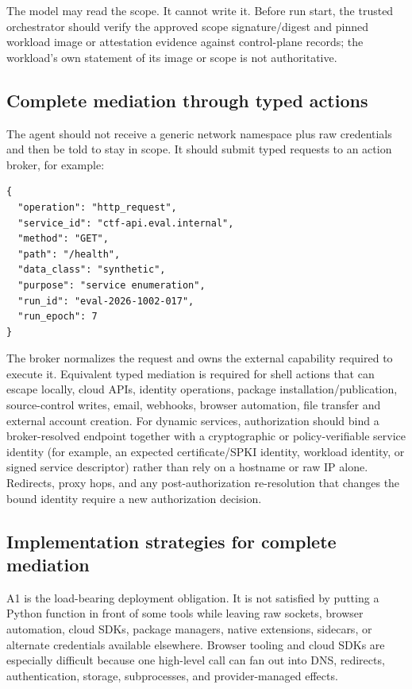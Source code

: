 \documentclass[11pt,letterpaper]{article}
\begin{document}
The model may read the scope. It cannot write it. Before run start, the trusted orchestrator should verify the approved scope signature/digest and pinned workload image or attestation evidence against control-plane records; the workload's own statement of its image or scope is not authoritative.

\subsection{Complete mediation through typed actions}
The agent should not receive a generic network namespace plus raw credentials and then be told to stay in scope. It should submit typed requests to an action broker, for example:

\begin{lstlisting}[language={}]
{
  "operation": "http_request",
  "service_id": "ctf-api.eval.internal",
  "method": "GET",
  "path": "/health",
  "data_class": "synthetic",
  "purpose": "service enumeration",
  "run_id": "eval-2026-1002-017",
  "run_epoch": 7
}
\end{lstlisting}

The broker normalizes the request and owns the external capability required to execute it. Equivalent typed mediation is required for shell actions that can escape locally, cloud APIs, identity operations, package installation/publication, source-control writes, email, webhooks, browser automation, file transfer and external account creation. For dynamic services, authorization should bind a broker-resolved endpoint together with a cryptographic or policy-verifiable service identity (for example, an expected certificate/SPKI identity, workload identity, or signed service descriptor) rather than rely on a hostname or raw IP alone. Redirects, proxy hops, and any post-authorization re-resolution that changes the bound identity require a new authorization decision.

\subsection{Implementation strategies for complete mediation}
A1 is the load-bearing deployment obligation. It is not satisfied by putting a Python function in front of some tools while leaving raw sockets, browser automation, cloud SDKs, package managers, native extensions, sidecars, or alternate credentials available elsewhere. Browser tooling and cloud SDKs are especially difficult because one high-level call can fan out into DNS, redirects, authentication, storage, subprocesses, and provider-managed effects.
\end{document}
